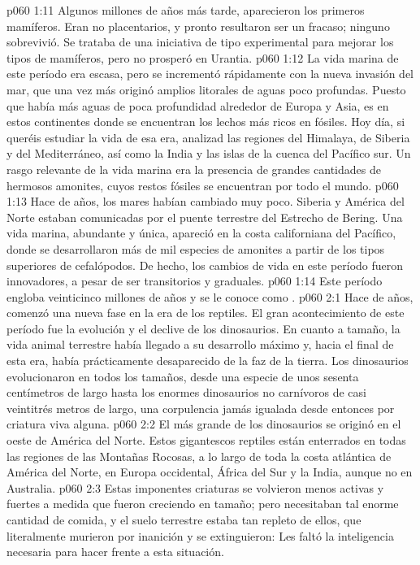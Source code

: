 \vs p060 1:11 Algunos millones de años más tarde, aparecieron los primeros mamíferos. Eran no placentarios, y pronto resultaron ser un fracaso; ninguno sobrevivió. Se trataba de una iniciativa de tipo experimental para mejorar los tipos de mamíferos, pero no prosperó en Urantia.
\vs p060 1:12 La vida marina de este período era escasa, pero se incrementó rápidamente con la nueva invasión del mar, que una vez más originó amplios litorales de aguas poco profundas. Puesto que había más aguas de poca profundidad alrededor de Europa y Asia, es en estos continentes donde se encuentran los lechos más ricos en fósiles. Hoy día, si queréis estudiar la vida de esa era, analizad las regiones del Himalaya, de Siberia y del Mediterráneo, así como la India y las islas de la cuenca del Pacífico sur. Un rasgo relevante de la vida marina era la presencia de grandes cantidades de hermosos amonites, cuyos restos fósiles se encuentran por todo el mundo.
\vs p060 1:13 \pc Hace  de años, los mares habían cambiado muy poco. Siberia y América del Norte estaban comunicadas por el puente terrestre del Estrecho de Bering. Una vida marina, abundante y única, apareció en la costa californiana del Pacífico, donde se desarrollaron más de mil especies de amonites a partir de los tipos superiores de cefalópodos. De hecho, los cambios de vida en este período fueron innovadores, a pesar de ser transitorios y graduales.
\vs p060 1:14 \pc Este período engloba veinticinco millones de años y se le conoce como .
\vs p060 2:1 Hace  de años, comenzó una nueva fase en la era de los reptiles. El gran acontecimiento de este período fue la evolución y el declive de los dinosaurios. En cuanto a tamaño, la vida animal terrestre había llegado a su desarrollo máximo y, hacia el final de esta era, había prácticamente desaparecido de la faz de la tierra. Los dinosaurios evolucionaron en todos los tamaños, desde una especie de unos sesenta centímetros de largo hasta los enormes dinosaurios no carnívoros de casi veintitrés metros de largo, una corpulencia jamás igualada desde entonces por criatura viva alguna.
\vs p060 2:2 El más grande de los dinosaurios se originó en el oeste de América del Norte. Estos gigantescos reptiles están enterrados en todas las regiones de las Montañas Rocosas, a lo largo de toda la costa atlántica de América del Norte, en Europa occidental, África del Sur y la India, aunque no en Australia.
\vs p060 2:3 Estas imponentes criaturas se volvieron menos activas y fuertes a medida que fueron creciendo en tamaño; pero necesitaban tal enorme cantidad de comida, y el suelo terrestre estaba tan repleto de ellos, que literalmente murieron por inanición y se extinguieron: Les faltó la inteligencia necesaria para hacer frente a esta situación.

